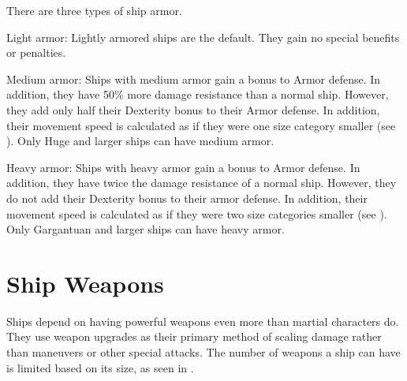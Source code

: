     There are three types of ship armor.
    \begin{raggeditemize}
        \item Light armor: Lightly armored ships are the default. They gain no special benefits or penalties.
        \item Medium armor: Ships with medium armor gain a  bonus to Armor defense.
            In addition, they have 50\% more damage resistance than a normal ship.
            However, they add only half their Dexterity bonus to their Armor defense.
            In addition, their movement speed is calculated as if they were one size category smaller (see ).
            Only Huge and larger ships can have medium armor.
        \item Heavy armor: Ships with heavy armor gain a  bonus to Armor defense.
            In addition, they have twice the damage resistance of a normal ship.
            However, they do not add their Dexterity bonus to their armor defense.
            In addition, their movement speed is calculated as if they were two size categories smaller (see ).
            Only Gargantuan and larger ships can have heavy armor.
    \end{raggeditemize}


\section{Ship Weapons}\label{Ship Weapons}
    Ships depend on having powerful weapons even more than martial characters do.
    They use weapon upgrades as their primary method of scaling damage rather than maneuvers or other special attacks.
    The number of weapons a ship can have is limited based on its size, as seen in .

